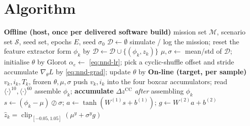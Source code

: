\section{Algorithm}
\begin{algorithm}[H]
\caption{NN-Direct --- offline training (once) and one on-line sample}
\begin{algorithmic}[1]
\Statex \textbf{Offline (host, once per delivered software build)}
\Require mission set $\mathcal{M}$, scenario set $\mathcal{S}$, seed set, epochs $E$, seed $\sigma_0$
\State $\mathcal{D}\gets\emptyset$
  \State simulate / log the mission; reset the feature extractor
   
    \State form $\phi_k$ by 
     $\mathcal{D}\gets\mathcal{D}\cup\{(\phi_k, z_k)\}$  \EndIf
  \EndFor
\EndFor
\State $\mu,\sigma \gets$ mean/std of $\mathcal{D}$; initialise $\theta$ by Glorot \citep{glorot2010init}
  \State $\alpha_e \gets$ \cref{eq:nnd-lr}; pick a cyclic-shuffle offset and stride
    \State accumulate $\nabla_\theta L$ by \cref{eq:nnd-grad}; update $\theta$ by 
  \EndFor
\EndFor
\Statex \textbf{On-line (target, per sample)}
\Require $v_k, i_k, T_k$, frozen $\theta,\mu,\sigma$
\State push $v_k,i_k$ into the four boxcar accumulators; read $\langle\cdot\rangle^{10},\langle\cdot\rangle^{60}$
\State assemble $\phi_k$; \textbf{accumulate} $\Delta z^{\mathrm{CC}}$ \emph{after} assembling $\phi_k$
\State $s \gets (\phi_k-\mu)\oslash\sigma$; $a\gets\tanh(W^{(1)}s + b^{(1)})$; $g\gets W^{(2)}a + b^{(2)}$
\Ensure $\hat z_k = \operatorname{clip}_{[-0.05,1.05]}(\mu^y + \sigma^y g)$
\end{algorithmic}
\end{algorithm}

